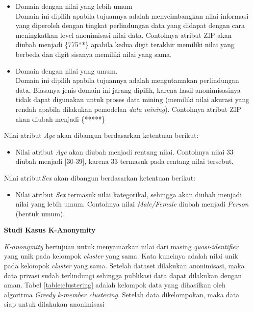 \documentclass[a4paper,twoside]{article}
\begin{document}
\begin{enumerate}
\begin{itemize}
\item Domain dengan nilai yang lebih umum\\
Domain ini dipilih apabila tujuannya adalah menyeimbangkan nilai informasi yang diperoleh dengan tingkat perlindungan data yang didapat dengan cara meningkatkan level anonimisasi nilai data. Contohnya atribut ZIP akan diubah menjadi \{775**\} apabila kedua digit terakhir memiliki nilai yang berbeda dan digit sisanya memiliki nilai yang sama.

\item Domain dengan nilai yang umum.\\
Domain ini dipilih apabila tujuannya adalah mengutamakan perlindungan data. Biasanya jenis domain ini jarang dipilih, karena hasil anonimisasinya tidak dapat digunakan untuk proses data mining (memiliki nilai akurasi yang rendah apabila dilakukan pemodelan \textit{data mining}). Contohnya atribut ZIP akan diubah menjadi \{*****\}

\end{itemize}

\noindent Nilai atribut \textit{Age} akan dibangun berdasarkan ketentuan berikut: 

\begin{itemize}
\item Nilai atribut \textit{Age} akan diubah menjadi rentang nilai. Contohnya nilai 33  diubah menjadi [30-39], karena 33 termasuk pada rentang nilai tersebut.
\end{itemize}

\noindent Nilai atribut\textit{Sex} akan dibangun berdasarkan ketentuan berikut: 

\begin{itemize}
\item Nilai atribut \textit{Sex} termasuk nilai kategorikal, sehingga akan diubah menjadi nilai yang lebih umum. Contohnya nilai \textit{Male/Female} diubah menjadi \textit{Person} (bentuk umum).
\end{itemize}
		
\textbf{Studi Kasus K-Anonymity}

\textit{K-anonymity} bertujuan untuk menyamarkan nilai dari masing \textit{quasi-identifier} yang unik pada kelompok \textit{cluster} yang sama. Kata kuncinya adalah nilai unik pada kelompok \textit{cluster} yang sama. Setelah dataset dilakukan anonimisasi, maka data privasi sudah terlindungi sehingga publikasi data dapat dilakukan dengan aman. Tabel \ref{table:clustering} adalah kelompok data yang dihasilkan oleh algoritma \textit{Greedy k-member clustering}. Setelah data dikelompokan, maka data siap untuk dilakukan anonimisasi


\end{enumerate}
\end{document}
